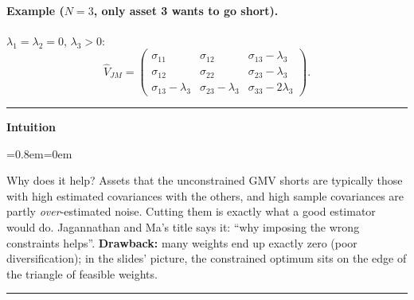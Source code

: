 \documentclass[11pt,a4paper]{report}
\newenvironment{notebox}[1]
  {\par\medskip\Needspace{6\baselineskip}\noindent\rule{\linewidth}{0.4pt}\par\nopagebreak
   \noindent\textbf{#1}\par\nopagebreak
   \begin{list}{}{\leftmargin=0.8em\rightmargin=0em\topsep=2pt}\item[]}
  {\end{list}\nopagebreak\noindent\rule{\linewidth}{0.4pt}\par\medskip}
\newenvironment{intuition}{\begin{notebox}{Intuition}}{\end{notebox}}
\begin{document}
\paragraph{Example ($N=3$, only asset 3 wants to go short).} $\lambda_1=\lambda_2=0$, $\lambda_3>0$:
\[
\hat V_{JM}=\begin{pmatrix}\sigma_{11}&\sigma_{12}&\sigma_{13}-\lambda_3\\
\sigma_{12}&\sigma_{22}&\sigma_{23}-\lambda_3\\
\sigma_{13}-\lambda_3&\sigma_{23}-\lambda_3&\sigma_{33}-2\lambda_3\end{pmatrix}.
\]
\begin{intuition}
Why does it help? Assets that the unconstrained GMV shorts are typically those
with high estimated covariances with the others, and high sample covariances are
partly \emph{over}-estimated noise. Cutting them is exactly what a good estimator
would do. Jagannathan and Ma's title says it: ``why imposing the wrong
constraints helps''. \textbf{Drawback:} many weights end up exactly zero (poor
diversification); in the slides' picture, the constrained optimum sits on the
edge of the triangle of feasible weights.
\end{intuition}
\end{document}
